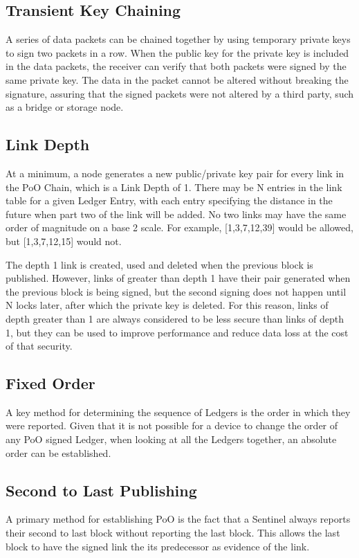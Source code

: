 \documentclass{article}
\begin{document}
\subsection {Transient Key Chaining}
A series of data packets can be chained together by using temporary private keys to sign two packets in a row.  When the public key for the private key is included in the data packets, the receiver can verify that both packets were signed by the same private key.  The data in the packet cannot be altered without breaking the signature, assuring that the signed packets were not altered by a third party, such as a bridge or storage node.

\subsection {Link Depth}
At a minimum, a node generates a new public/private key pair for every link in the PoO Chain, which is a Link Depth of 1.  There may be N entries in the link table for a given Ledger Entry, with each entry specifying the distance in the future when part two of the link will be added. No two links may have the same order of magnitude on a base 2 scale. For example, [1,3,7,12,39] would be allowed, but [1,3,7,12,15] would not.

The depth 1 link is created, used and deleted when the previous block is published.  However, links of greater than depth 1 have their pair generated when the previous block is being signed, but the second signing does not happen until N locks later, after which the private key is deleted.  For this reason, links of depth greater than 1 are always considered to be less secure than links of depth 1, but they can be used to improve performance and reduce data loss at the cost of that security.

\subsection {Fixed Order}
A key method for determining the sequence of Ledgers is the order in which they were reported.  Given that it is not possible for a device to change the order of any PoO signed Ledger, when looking at all the Ledgers together, an absolute order can be established.

\subsection {Second to Last Publishing}
A primary method for establishing PoO is the fact that a Sentinel always reports their second to last block without reporting the last block.  This allows the last block to have the signed link the its predecessor as evidence of the link.
\end{document}

